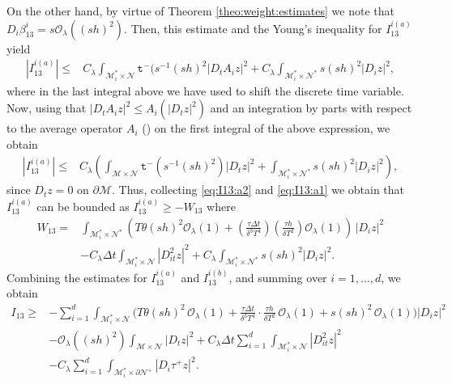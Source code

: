 \documentclass[11pt,oneside,leqno]{amsart}
\numberwithin{equation}{section}
\numberwithin{equation}{section}
\newcommand{\trm}{\mathtt t^-}
\begin{document}
\par On the other hand, by virtue of Theorem \eqref{theo:weight:estimates}  we note that $D_{i}\beta_{13}^{i}=s\mathcal{O}_{\lambda}((sh)^{2})$. Then, this estimate and the Young's inequality for $I_{13}^{i(a)}$ yield 
\begin{equation*}
    \begin{split}
      |I_{13}^{i(a)}|\leq&C_{\lambda} \int_{\mathcal{M}^{\ast}_{i}\times\mathcal{N}}\trm(s^{-1}(sh)^{2}|D_{t}A_{i}z|^{2}+C_{\lambda}\int_{\mathcal{M}^{\ast}_{i}\times\mathcal{N}^{\ast}}s(sh)^{2}|D_{i}z|^{2},
    \end{split}
\end{equation*}
where in the last integral above we have used \cite[Proposition 2, equation (2.4)]{LMPZ:2023} to shift the discrete time variable. Now, using that $|D_{t}A_{i}z|^{2}\leq A_{i}(|D_{t}z|^{2})$ and an integration by parts with respect to the average operator $A_{i}$ (\cite[Lemma 2.2, equation (16)]{LDOP-2021}) on the first integral of the above expression, we obtain
\begin{equation}\label{eq:I13:a1}
    \begin{split}
      |I_{13}^{i(a)}|\leq&C_{\lambda} \left(\int_{\mathcal{M}\times\mathcal{N}}\trm(s^{-1}(sh)^{2})|D_{t}z|^{2}+\int_{\mathcal{M}_{i}^{\ast}\times\mathcal{N}^{\ast}}s(sh)^{2}|D_{i}z|^{2}\right),
    \end{split}
\end{equation}
since $D_{t}z=0$ on $\partial\mathcal{M}$. Thus, collecting \eqref{eq:I13:a2} and \eqref{eq:I13:a1} we obtain that $I_{13}^{i(a)}$ can be bounded as $\displaystyle I_{13}^{i(a)}\geq -W_{13}$ where
\begin{equation}
    \begin{split}
          W_{13}=&\int_{\mathcal{M}^{\ast}_{i}\times\mathcal{N}^{\ast}}\left( T\theta(sh)^{2}\mathcal{O}_{\lambda}(1)+\left( \frac{\tau\Delta t}{\delta^{3}T^{4}}\right)\left( \frac{\tau h}{\delta T^{2}}\right)\mathcal{O}_{\lambda}(1)\right)\,|D_{i}z|^{2}\\
        &-C_{\lambda}\Delta t \int_{\mathcal{M}_{i}^{\ast}\times\mathcal{N}}|D_{it}^{2}z|^{2}+C_{\lambda}\int_{\mathcal{M}_{i}^{\ast}\times\mathcal{N}^{\ast}}s(sh)^{2}|D_{i}z|^{2}. 
    \end{split}
\end{equation}
Combining the estimates for $I_{13}^{i(a)}$ and $I_{13}^{i(b)}$,
and summing over $i=1,\ldots,d$, we obtain
\begin{equation}\label{eq:I13:final}
\begin{aligned}
I_{13}\geq&-\sum_{i=1}^{d}\int_{\mathcal{M}_{i}^{\ast}\times\mathcal{N}}
\bigg(T\theta(sh)^{2}\,\mathcal{O}_{\lambda}(1)
+\frac{\tau\Delta t}{\delta^{3}T^{4}}\cdot\frac{\tau h}{\delta T^{2}}\,
\mathcal{O}_{\lambda}(1)
+s(sh)^{2}\,\mathcal{O}_{\lambda}(1)\bigg)|D_{i}z|^{2}\\
&-\mathcal{O}_{\lambda}((sh)^{2})
\int_{\mathcal{M}\times\mathcal{N}}|D_{t}z|^{2}
+C_{\lambda}\Delta t\sum_{i=1}^{d}
\int_{\mathcal{M}_{i}^{\ast}\times\mathcal{N}}|D_{it}^{2}z|^{2}\\
&-C_{\lambda}\sum_{i=1}^{d}
\int_{\mathcal{M}_{i}^{\ast}\times\partial\mathcal{N}^{+}}
|D_{i}\tau^{+}z|^{2}.
\end{aligned}
\end{equation}
\end{document}

